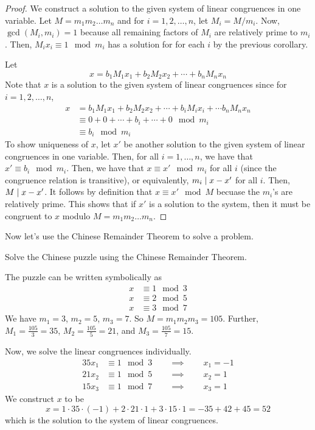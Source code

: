 \begin{proof}
    We construct a solution to the given system of linear congruences in one variable. Let $M = m_1m_2\ldots m_n$ and for $i = 1,2,\ldots,n$, let $M_i = M / m_i$. Now, $\gcd(M_i,m_i) = 1$ because all remaining factors of $M_i$ are relatively prime to $m_i$. Then, $M_i x_i \equiv 1 \mod m_i$ has a solution for for each $i$ by the previous corollary.

    Let
    $$
    x = b_1 M_1 x_1 + b_2 M_2 x_2 + \cdots + b_n M_n x_n
    $$
    Note that $x$ is a solution to the given system of linear congruences since for $i = 1,2,\ldots,n$,
    $$
    \begin{aligned}
        x &= b_1 M_1 x_1 + b_2 M_2 x_2 + \cdots + b_i M_i x_i + \cdots b_n M_n x_n \\
        &\equiv 0 + 0 + \cdots + b_i + \cdots + 0 \mod m_i \\
        &\equiv b_i \mod m_i
    \end{aligned}
    $$
    To show uniqueness of $x$, let $x'$ be another solution to the given system of linear congruences in one variable. Then, for all $i = 1,\ldots,n$, we have that $x' \equiv b_i \mod m_i$. Then, we have that $x \equiv x' \mod m_i$ for all $i$ (since the congruence relation is transitive), or equivalently, $m_i \mathrel{\mid} x - x'$ for all $i$. Then, $M \mathrel{\mid} x-x'$. It follows by definition that $x \equiv x' \mod M$ becuase the $m_i$'s are relatively prime. This shows that if $x'$ is a solution to the system, then it must be congruent to $x$ modulo $M = m_1m_2\ldots m_n$.
\end{proof}

Now let's use the Chinese Remainder Theorem to solve a problem.

\begin{example}
Solve the Chinese puzzle using the Chinese Remainder Theorem.
\end{example}

The puzzle can be written symbolically as
$$
\begin{aligned}
    x &\equiv 1 \mod 3 \\
    x &\equiv 2 \mod 5 \\
    x &\equiv 3 \mod 7
\end{aligned}
$$
We have $m_1 = 3$, $m_2 = 5$, $m_3 = 7$. So $M = m_1 m_2 m_3 = 105$. Further, $M_1 = \frac{105}{3} = 35$, $M_2 = \frac{105}{5} = 21$, and $M_3 = \frac{105}{7} = 15$.

Now, we solve the linear congruences individually.
$$
\begin{aligned}
    35x_1 &\equiv 1 \mod 3 \qquad \implies \qquad x_1 = -1 \\
    21x_2 &\equiv 1 \mod 5 \qquad \implies \qquad x_2 = 1 \\
    15x_3 &\equiv 1 \mod 7 \qquad \implies \qquad x_3 = 1
\end{aligned}
$$
We construct $x$ to be
$$
x = 1 \cdot 35 \cdot (-1) + 2 \cdot 21 \cdot 1 + 3 \cdot 15 \cdot 1 = -35 + 42 + 45 = 52
$$
which is the solution to the system of linear congruences.

